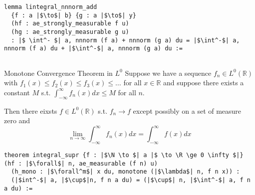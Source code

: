 \documentclass[a4paper]{article}
\newcommand{\R}{\mathbb{R}}
\newcommand{\N}{\mathbb{N}}
\begin{document}
\begin{listing}[!ht]
\begin{verbatim}
lemma lintegral_nnnorm_add
  {f : a |$\to$| b} {g : a |$\to$| y} 
  (hf : ae_strongly_measurable f u) 
  (hg : ae_strongly_measurable g u) 
  : |$ \int^- $| a, nnnorm (f a) + nnnorm (g a) du = |$\int^-$| a, nnnorm (f a) du + |$\int^-$| a, nnnorm (g a) du :=
	
\end{verbatim}
\end{listing}

\begin{Theorem}{Monotone Convergence Theorem in $L^0$}{}
	Suppose we have a sequence $f_n \in L^0(\R)$ with $f_1(x) \le  f_2(x) \le  f_3(x) \le  \ldots$ for all $x \in \R$ and suppose there exists a constant $M$ s.t.  $\int_{-\infty}^{\infty} f_n(x) dx \le  M$ for all $n$.

	Then there eixsts  $f \in L^0(\R)$ s.t. $f_n \to f$ except possibly on a set of measure zero and \[
		\lim_{n \to \infty} \int_{-\infty}^{\infty} f_n(x) dx = \int_{-\infty}^{\infty} f(x)dx
	\] 
\end{Theorem}

\begin{listing}[!ht]
\begin{verbatim}
theorem integral_supr {f : |$\N \to $| a |$ \to \R \ge 0 \infty $|} 
(hf : |$\forall$| n, ae_measurable (f n) u)
  (h_mono : |$\forall^m$| x du, monotone (|$\lambda$| n, f n x)) :
  (|$int^-$| a, |$\cup$|n, f n a du) = (|$\cup$| n, |$\int^-$| a, f n a du) :=
\end{verbatim}
\end{listing}

\nocite{*}
\newpage

\end{document}
